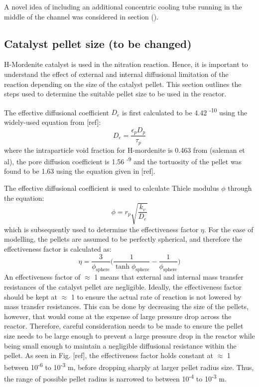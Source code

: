 A novel idea of including an additional concentric cooling tube running in the middle of the channel was considered in section (). %



\subsection{Catalyst pellet size (to be changed)}
H-Mordenite catalyst is used in the nitration reaction. 
 Hence, it is important to understand the effect of external and internal diffusional limitation of the reaction depending on the size of the catalyst pellet. This section outlines the steps used to determine the suitable pellet size to be used in the reactor.

The effective diffusional coefficient $D_e$ is first calculated to be 4.42 \textsuperscript{-10} using the widely-used equation from [ref]: 
\begin{equation}
    D_e = \frac{\epsilon_p D_p}{\tau_p}
\end{equation}
where the intraparticle void fraction for H-mordenite is 0.463 from (saleman et al), the pore diffusion coefficient is 1.56 \textsuperscript{-9} and the tortuosity of the pellet was found to be 1.63 using the equation given in [ref]. 

The effective diffusional coefficient is used to calculate Thiele modulus $\phi$ through the equation:
\begin{equation}
    \phi = r_p \sqrt{\frac{k_v}{D_e}}
\end{equation}
which is subsequently used to determine the effectiveness factor $\eta$. For the ease of modelling, the pellets are assumed to be perfectly spherical, and therefore the effectiveness factor is calculated as: 
\begin{equation}
    \eta = \frac{3}{\phi_{\mathrm{sphere}}} \bigg(\frac{1}{\tanh \phi_{\mathrm{sphere}}} - \frac{1}{\phi_{\mathrm{sphere}}}\bigg)
\end{equation}
An effectiveness factor of $\approx$ 1 means that external and internal mass transfer resistances of the catalyst pellet are negligible. Ideally, the effectiveness factor should be kept at $\approx$ 1 to ensure the actual rate of reaction is not lowered by mass transfer resistances. This can be done by decreasing the size of the pellets, however, that would come at the expense of large pressure drop across the reactor. Therefore, careful consideration needs to be made to ensure the pellet size needs to be large enough to prevent a large pressure drop in the reactor while being small enough to maintain a negligible diffusional resistance within the pellet. As seen in Fig. [ref], the effectiveness factor holds constant at $\approx$ 1 between 10\textsuperscript{-6} to 10\textsuperscript{-3} m, before dropping sharply at larger pellet radius size. Thus, the range of possible pellet radius is narrowed to between 10\textsuperscript{-4} to 10\textsuperscript{-3} m. 

